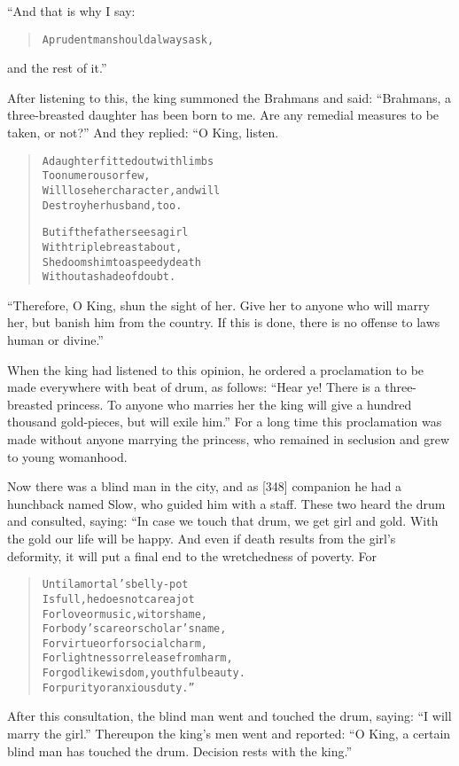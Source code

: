 \documentclass[article, twoside, 14pt]{memoir}
\renewenvironment{verbatim}{%
\begin{quote}%
\vskip -10pt%
\begin{alltt}\normalfont\large}{\end{alltt}%
\end{quote}%
\vskip -10pt
} %
\begin{document}
“And that is why I say:

\begin{verbatim}
A prudent man should always ask,
\end{verbatim}
and the rest of it.”

After listening to this, the king summoned the Brahmans and said:
``Brahmans, a three-breasted daughter has been born to me. Are any remedial measures to be taken, or not?''
And they replied: “O King, listen.

\begin{verbatim}
A daughter fitted out with limbs
    Too numerous or few,
Will lose her character, and will
    Destroy her husband, too.

But if the father sees a girl
    With triple breast about,
She dooms him to a speedy death
    Without a shade of doubt.
\end{verbatim}
``Therefore, O King, shun the sight of her. Give her to anyone who will marry her, but banish him from the country. If this is done, there is no offense to laws human or divine.''

When the king had listened to this opinion, he ordered a
proclamation to be made everywhere with beat of drum, as follows:
``Hear ye! There is a three-breasted princess. To anyone who marries her the king will give a hundred thousand gold-pieces, but will exile him.''
For a long time this proclamation was made without anyone marrying
the princess, who remained in seclusion and grew to young
womanhood.

Now there was a blind man in the city, and as [348] companion he
had a hunchback named Slow, who guided him with a staff. These two
heard the drum and consulted, saying: “In case we touch that drum,
we get girl and gold. With the gold our life will be happy. And
even if death results from the girl's deformity, it will put a
final end to the wretchedness of poverty. For

\begin{verbatim}
Until a mortal's belly-pot
Is full, he does not care a jot
For love or music, wit or shame,
For body's care or scholar's name,
For virtue or for social charm,
For lightness or release from harm,
For godlike wisdom, youthful beauty.
For purity or anxious duty.”
\end{verbatim}
After this consultation, the blind man went and touched the drum,
saying: ``I will marry the girl.'' Thereupon the king's men went
and reported:
``O King, a certain blind man has touched the drum. Decision rests with the king.''
\end{document}
